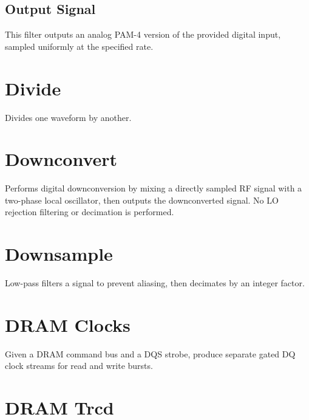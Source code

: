 \subsection{Output Signal}

This filter outputs an analog PAM-4 version of the provided digital input, sampled uniformly at the specified rate.

\pagebreak
\section{Divide}

Divides one waveform by another.

\pagebreak
\section{Downconvert}

Performs digital downconversion by mixing a directly sampled RF signal with a two-phase local oscillator, then outputs
the downconverted signal. No LO rejection filtering or decimation is performed.

\pagebreak
\section{Downsample}

Low-pass filters a signal to prevent aliasing, then decimates by an integer factor.

\pagebreak
\section{DRAM Clocks}

Given a DRAM command bus and a DQS strobe, produce separate gated DQ clock streams for read and write bursts.

\pagebreak
\section{DRAM Trcd}

